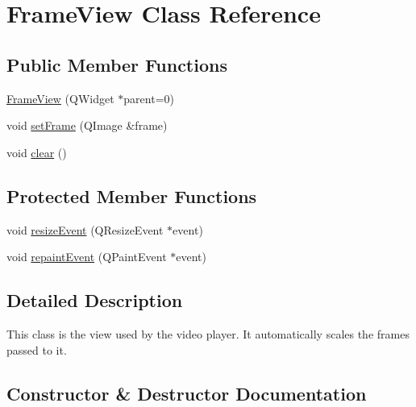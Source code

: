 \hypertarget{classGUI_1_1Player_1_1FrameView}{}\section{Frame\+View Class Reference}
\label{classGUI_1_1Player_1_1FrameView}
\subsection*{Public Member Functions}
\begin{DoxyCompactItemize}
\item 
\hyperlink{classGUI_1_1Player_1_1FrameView_a75ab7862211fa66433f92fc148ba9e7d}{Frame\+View} (Q\+Widget $\ast$parent=0)
\item 
void \hyperlink{classGUI_1_1Player_1_1FrameView_ab38693f5302565670675156a8f33d77c}{set\+Frame} (Q\+Image \&frame)
\item 
void \hyperlink{classGUI_1_1Player_1_1FrameView_ac8bb3912a3ce86b15842e79d0b421204}{clear} ()
\end{DoxyCompactItemize}
\subsection*{Protected Member Functions}
\begin{DoxyCompactItemize}
\item 
void \hyperlink{classGUI_1_1Player_1_1FrameView_a6fbc07cec19868c41d513b9ef8343e9a}{resize\+Event} (Q\+Resize\+Event $\ast$event)
\item 
void \hyperlink{classGUI_1_1Player_1_1FrameView_a67e5a053c3728683d415a35d1eafa5c2}{repaint\+Event} (Q\+Paint\+Event $\ast$event)
\end{DoxyCompactItemize}


\subsection{Detailed Description}
This class is the view used by the video player. It automatically scales the frames passed to it. 

\subsection{Constructor \& Destructor Documentation}
\hypertarget{classGUI_1_1Player_1_1FrameView_a75ab7862211fa66433f92fc148ba9e7d}{}
